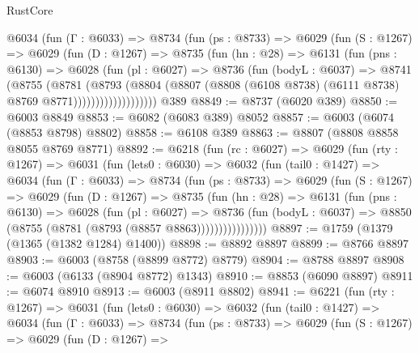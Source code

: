 \begin{lexlean}{RustCore}
\begin{coremodule}
            @6034
              (fun (Γ : @6033) =>
              @8734
                (fun (ps : @8733) =>
                @6029
                  (fun (S : @1267) =>
                  @6029
                    (fun (D : @1267) =>
                    @8735
                      (fun (hn : @28) =>
                      @6131
                        (fun (pns : @6130) =>
                        @6028
                          (fun (pl : @6027) =>
                          @8736
                            (fun (bodyL : @6037) =>
                            @8741
                              (@8755
                                (@8781
                                  (@8793
                                    (@8804
                                      (@8807
                                        (@8808
                                          (@6108 @8738)
                                          (@6111 @8738)
                                          @8769
                                          @8771)))))))))))))))))))
    @389
@8849 := @8737 (@6020 @389)
@8850 := @6003 @8849
@8853 := @6082 (@6083 @389) @8052
@8857 := @6003 (@6074 (@8853 @8798) @8802)
@8858 := @6108 @389
@8863 := @8807 (@8808 @8858 @8055 @8769 @8771)
@8892 := @6218
    (fun (rc : @6027) =>
    @6029
      (fun (rty : @1267) =>
      @6031
        (fun (lets0 : @6030) =>
        @6032
          (fun (tail0 : @1427) =>
          @6034
            (fun (Γ : @6033) =>
            @8734
              (fun (ps : @8733) =>
              @6029
                (fun (S : @1267) =>
                @6029
                  (fun (D : @1267) =>
                  @8735
                    (fun (hn : @28) =>
                    @6131
                      (fun (pns : @6130) =>
                      @6028
                        (fun (pl : @6027) =>
                        @8736
                          (fun (bodyL : @6037) =>
                          @8850 (@8755 (@8781 (@8793 (@8857 @8863))))))))))))))))
@8897 := @1759 (@1379 (@1365 (@1382 @1284) @1400))
@8898 := @8892 @8897
@8899 := @8766 @8897
@8903 := @6003 (@8758 (@8899 @8772) @8779)
@8904 := @8788 @8897
@8908 := @6003 (@6133 (@8904 @8772) @1343)
@8910 := @8853 (@6090 @8897)
@8911 := @6074 @8910
@8913 := @6003 (@8911 @8802)
@8941 := @6221
    (fun (rty : @1267) =>
    @6031
      (fun (lets0 : @6030) =>
      @6032
        (fun (tail0 : @1427) =>
        @6034
          (fun (Γ : @6033) =>
          @8734
            (fun (ps : @8733) =>
            @6029
              (fun (S : @1267) =>
              @6029
                (fun (D : @1267) =>

\end{coremodule}
\end{lexlean}
